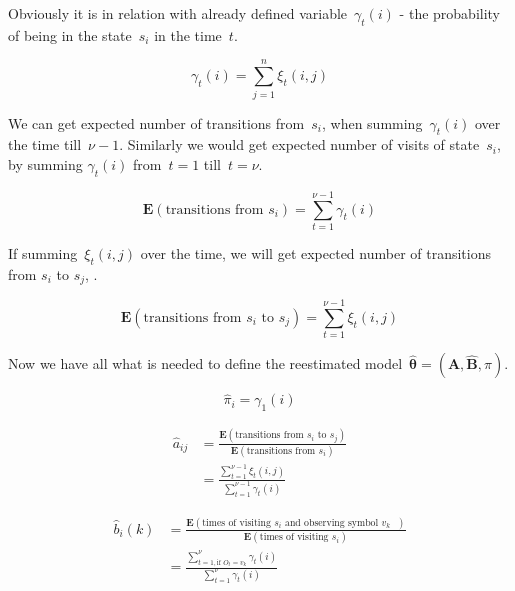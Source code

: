 \documentclass[thesis=M,english]{FITthesis}[2012/10/20]
\newcommand{\matr}[1]{\mathbf{#1}}
\begin{document}
Obviously it is in relation with already defined variable~$\gamma_t(i)$ - the probability of being in the state~$s_i$ in the time~$t$.

\begin{equation}
\gamma_t(i) = \sum_{j=1}^n \xi_t(i,j)  
\end{equation}

We can get expected number of transitions from~$s_i$, when summing~$\gamma_t(i)$ over the time till~$\nu-1$. Similarly we would get expected number of visits of state~$s_i$, by summing $\gamma_t(i)$ from~$t=1$ till~$t=\nu$. 

\begin{equation}
\mathbf{E}(\text{transitions from $s_i$}) = \sum_{t=1}^{\nu-1} \gamma_t(i)  
\end{equation}

If summing~$\xi_t(i,j)$ over the time, we will get expected number of transitions from $s_i$ to $s_j$, . 

\begin{equation}
\mathbf{E}(\text{transitions from $s_i$ to $s_j$}) = \sum_{t=1}^{\nu-1} \xi_t(i,j)  
\end{equation}

Now we have all what is needed to define the reestimated model~$\hat{\matr{\theta}}=(\hat{\matr{A}},\hat{\matr{B}},\hat\pi)$.

\begin{equation}\label{eq:bwpi}
\hat\pi_i = \gamma_1(i)  
\end{equation}

\begin{equation}\label{eq:bwa}
\begin{aligned}
\hat a_{ij} &= \frac{\mathbf{E}(\text{transitions from $s_i$ to $s_j$})}
				   {\mathbf{E}(\text{transitions from $s_i$})}  \\
		    &= \frac{\sum\limits_{t=1}^{\nu-1} \xi_t(i,j)}{\sum\limits_{t=1}^{\nu-1} \gamma_t(i) }
\end{aligned}
\end{equation}

\begin{equation}\label{eq:bwb}
\begin{aligned}
\hat b_{i}(k) &= \frac{\mathbf{E}(\text{times of visiting $s_i$ and observing symbol $v_k$ })}
				   {\mathbf{E}(\text{times of visiting $s_i$})} \\
			  &= \frac{\sum\limits_{t=1, \text{if } O_t = v_k  }^{\nu} \gamma_t(i)}{\sum\limits_{t=1}^{\nu} \gamma_t(i) } 
\end{aligned}
\end{equation}
\end{document}
